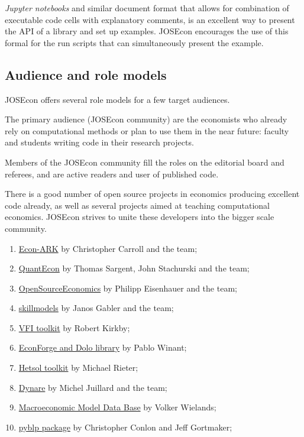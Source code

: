 \emph{Jupyter notebooks} and similar document format that allows for combination of executable 
code cells with explanatory comments, is an excellent way to present the API of a library and set
up examples. 
JOSEcon encourages the use of this formal for the run scripts that can simultaneously present 
the example.


\subsection{Audience and role models}

JOSEcon offers several role models for a few target audiences.

The primary audience (JOSEcon community) are the economists who already rely on computational
methods or plan to use them in the near future: faculty and students writing code in their 
research projects.

Members of the JOSEcon community fill the roles on the editorial board and referees, and are
active readers and user of published code.

There is a good number of open source projects in economics producing excellent code already, 
as well as several projects aimed at teaching computational economics.
JOSEcon strives to unite these developers into the bigger scale community.

\begin{enumerate}
\item \href{https://econ-ark.org/}{Econ-ARK} by Christopher Carroll and the team;
\item \href{https://quantecon.org/}{QuantEcon} by Thomas Sargent, John Stachurski and the team;
\item \href{https://github.com/OpenSourceEconomics}{OpenSourceEconomics} by Philipp Eisenhauer and the team;
\item \href{https://github.com/janosg/skillmodels}{skillmodels} by Janos Gabler and the team;
\item \href{http://www.vfitoolkit.com/}{VFI toolkit} by Robert Kirkby;
\item \href{https://github.com/EconForge}{EconForge and Dolo library} by Pablo Winant;
\item \href{}{Hetsol toolkit} by Michael Rieter;
\item \href{https://www.dynare.org}{Dynare} by Michel Juillard and the team;
\item \href{http://www.macromodelbase.com}{Macroeconomic Model Data Base} by Volker Wielands;
\item \href{https://pypi.org/project/pyblp/}{pyblp package} by Christopher Conlon and Jeff Gortmaker;
\end{enumerate}

